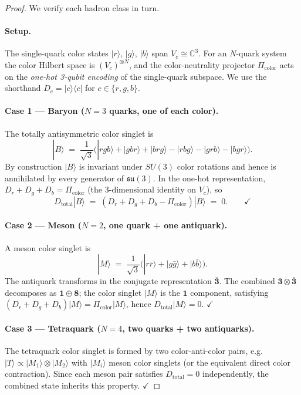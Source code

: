 \documentclass[12pt,a4paper]{article}
\newcommand{\Picolor}{\Pi_{\mathrm{color}}}
\newcommand{\Dtotal}{D_{\mathrm{total}}}
\newcommand{\CCC}{\mathbb{C}}
\newcommand{\ket}[1]{|#1\rangle}
\newcommand{\bra}[1]{\langle #1|}
\begin{document}
\begin{proof}
We verify each hadron class in turn.

\paragraph{Setup.}
The single-quark color states $\ket{r}$, $\ket{g}$, $\ket{b}$ span $V_c \cong \CCC^3$.
For an $N$-quark system the color Hilbert space is $(V_c)^{\otimes N}$, and the
color-neutrality projector $\Picolor$ acts on the
\emph{one-hot 3-qubit encoding} of the single-quark subspace.
We use the shorthand $D_c = \ket{c}\bra{c}$ for $c \in \{r,g,b\}$.

\medskip
\paragraph{Case 1 — Baryon ($N = 3$ quarks, one of each color).}
The totally antisymmetric color singlet is
\begin{equation}
  \ket{B} \;=\; \frac{1}{\sqrt{3}}\bigl(\ket{rgb} + \ket{gbr} + \ket{brg}
                                        - \ket{rbg} - \ket{grb} - \ket{bgr}\bigr) .
\end{equation}
By construction $\ket{B}$ is invariant under $SU(3)$ color rotations and hence is
annihilated by every generator of $\mathfrak{su}(3)$.  In the one-hot representation,
$D_r + D_g + D_b = \Picolor$ (the 3-dimensional identity on $V_c$), so
\begin{equation}
  \Dtotal\ket{B} \;=\; (D_r + D_g + D_b - \Picolor)\ket{B} \;=\; 0 . \qquad \checkmark
\end{equation}

\paragraph{Case 2 — Meson ($N = 2$, one quark + one antiquark).}
A meson color singlet is
\begin{equation}
  \ket{M} \;=\; \frac{1}{\sqrt{3}}\bigl(\ket{r\bar{r}} + \ket{g\bar{g}} + \ket{b\bar{b}}\bigr) .
\end{equation}
The antiquark transforms in the conjugate representation $\bar{\mathbf{3}}$.
The combined $\mathbf{3} \otimes \bar{\mathbf{3}}$ decomposes as $\mathbf{1} \oplus \mathbf{8}$;
the color singlet $\ket{M}$ is the $\mathbf{1}$ component, satisfying
$(D_r + D_g + D_b)\ket{M} = \Picolor\ket{M}$, hence $\Dtotal\ket{M} = 0$. $\checkmark$

\paragraph{Case 3 — Tetraquark ($N = 4$, two quarks + two antiquarks).}
The tetraquark color singlet is formed by two color-anti-color pairs, e.g.\
$\ket{T} \propto \ket{M_1} \otimes \ket{M_2}$ with $\ket{M_i}$ meson color
singlets (or the equivalent direct color contraction).  Since each meson pair
satisfies $\Dtotal = 0$ independently, the combined state inherits this property. $\checkmark$


\end{proof}
\end{document}
